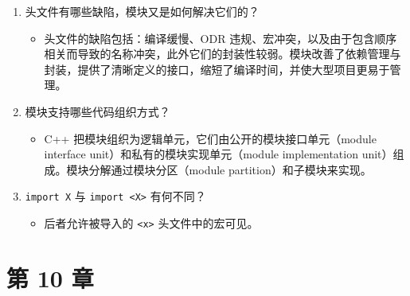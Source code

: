 \begin{enumerate}
\item 头文件有哪些缺陷，模块又是如何解决它们的？

\begin{itemize}
\item 头文件的缺陷包括：编译缓慢、ODR 违规、宏冲突，以及由于包含顺序相关而导致的名称冲突，此外它们的封装性较弱。模块改善了依赖管理与封装，提供了清晰定义的接口，缩短了编译时间，并使大型项目更易于管理。
\end{itemize}
\item 模块支持哪些代码组织方式？

\begin{itemize}
\item C++ 把模块组织为逻辑单元，它们由公开的模块接口单元（module interface unit）和私有的模块实现单元（module implementation unit）组成。模块分解通过模块分区（module partition）和子模块来实现。
\end{itemize}
\item \texttt{import X} 与 \texttt{import <X>} 有何不同？

\begin{itemize}
\item 后者允许被导入的 \texttt{<x>} 头文件中的宏可见。
\end{itemize}
\end{enumerate}

\section*{第 10 章}

